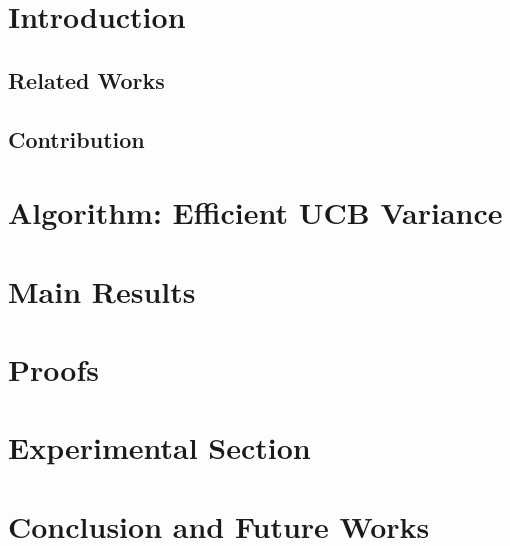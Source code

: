 \documentclass{llncs}
\begin{document}
\section{Introduction}
\label{sec:intro}


\subsection{Related Works}
\label{sec:related}



\subsection{Contribution}
\label{sec:contri}


\section{Algorithm: Efficient UCB Variance}
\label{sec:eucbv}


\section{Main Results} 
\label{sec:results}


\section{Proofs}
\label{sec:proofTheorem}


\section{Experimental Section}
\label{sec:expt}


\section{Conclusion and Future Works}
\label{sec:conc}



\clearpage
\newpage



\end{document}
